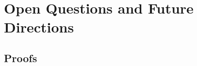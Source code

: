 \documentclass[a4paper]{article}
\theoremstyle{thmstyleone}%
\theoremstyle{thmstyletwo}%
\theoremstyle{thmstylethree}%
\numberwithin{equation}{section}
\begin{document}


\section{Open Questions and Future Directions}\label{sec:conclusion}



\backmatter



\newpage
\begin{appendices}
\section{Proofs}\label{app:proofs}


\end{appendices}


\end{document}
